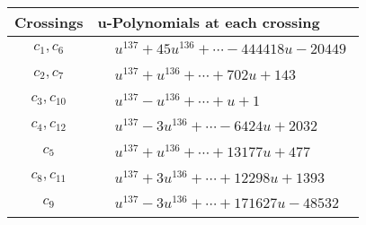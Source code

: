 \documentclass[1p]{elsarticle_modified}
\theoremstyle{definition}
\begin{document}
\begin{tabular}{m{50pt}|m{274pt}}
Crossings & \hspace{64pt}u-Polynomials at each crossing \\
\hline $$\begin{aligned}c_{1},c_{6}\end{aligned}$$&$\begin{aligned}
&u^{137}+45 u^{136}+\cdots-444418 u-20449
\end{aligned}$\\
\hline $$\begin{aligned}c_{2},c_{7}\end{aligned}$$&$\begin{aligned}
&u^{137}+u^{136}+\cdots+702 u+143
\end{aligned}$\\
\hline $$\begin{aligned}c_{3},c_{10}\end{aligned}$$&$\begin{aligned}
&u^{137}- u^{136}+\cdots+u+1
\end{aligned}$\\
\hline $$\begin{aligned}c_{4},c_{12}\end{aligned}$$&$\begin{aligned}
&u^{137}-3 u^{136}+\cdots-6424 u+2032
\end{aligned}$\\
\hline $$\begin{aligned}c_{5}\end{aligned}$$&$\begin{aligned}
&u^{137}+u^{136}+\cdots+13177 u+477
\end{aligned}$\\
\hline $$\begin{aligned}c_{8},c_{11}\end{aligned}$$&$\begin{aligned}
&u^{137}+3 u^{136}+\cdots+12298 u+1393
\end{aligned}$\\
\hline $$\begin{aligned}c_{9}\end{aligned}$$&$\begin{aligned}
&u^{137}-3 u^{136}+\cdots+171627 u-48532
\end{aligned}$\\
\hline
\end{tabular}\\~\\
\end{document}
